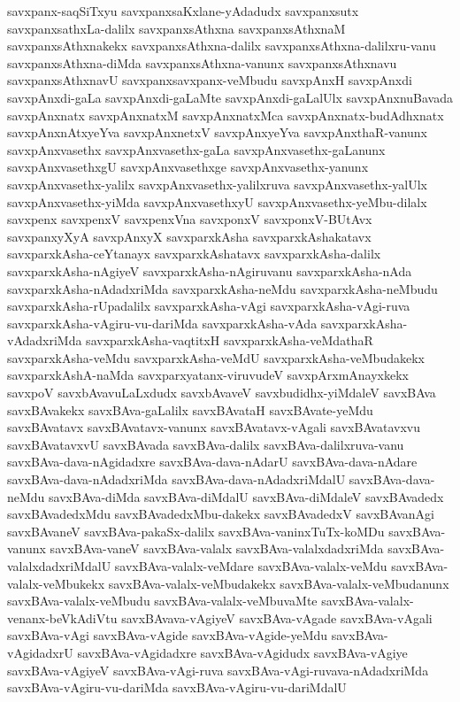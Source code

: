 {savxpanx-saqSiTxyu
savxpanxsaKxlane-yAdadudx
savxpanxsutx
savxpanxsathxLa-dalilx
savxpanxsAthxna
savxpanxsAthxnaM
savxpanxsAthxnakekx
savxpanxsAthxna-dalilx
savxpanxsAthxna-dalilxru-vanu
savxpanxsAthxna-diMda
savxpanxsAthxna-vanunx
savxpanxsAthxnavu
savxpanxsAthxnavU
savxpanxsavxpanx-veMbudu
savxpAnxH
savxpAnxdi
savxpAnxdi-gaLa
savxpAnxdi-gaLaMte
savxpAnxdi-gaLalUlx
savxpAnxnuBavada
savxpAnxnatx
savxpAnxnatxM
savxpAnxnatxMca
savxpAnxnatx-budAdhxnatx
savxpAnxnAtxyeYva
savxpAnxnetxV
savxpAnxyeYva
savxpAnxthaR-vanunx
savxpAnxvasethx
savxpAnxvasethx-gaLa
savxpAnxvasethx-gaLanunx
savxpAnxvasethxgU
savxpAnxvasethxge
savxpAnxvasethx-yanunx
savxpAnxvasethx-yalilx
savxpAnxvasethx-yalilxruva
savxpAnxvasethx-yalUlx
savxpAnxvasethx-yiMda
savxpAnxvasethxyU
savxpAnxvasethx-yeMbu-dilalx
savxpenx
savxpenxV
savxpenxVna
savxponxV
savxponxV-BUtAvx
savxpanxyXyA
savxpAnxyX
savxparxkAsha
savxparxkAshakatavx
savxparxkAsha-ceYtanayx
savxparxkAshatavx
savxparxkAsha-dalilx
savxparxkAsha-nAgiyeV
savxparxkAsha-nAgiruvanu
savxparxkAsha-nAda
savxparxkAsha-nAdadxriMda
savxparxkAsha-neMdu
savxparxkAsha-neMbudu
savxparxkAsha-rUpadalilx
savxparxkAsha-vAgi
savxparxkAsha-vAgi-ruva
savxparxkAsha-vAgiru-vu-dariMda
savxparxkAsha-vAda
savxparxkAsha-vAdadxriMda
savxparxkAsha-vaqtitxH
savxparxkAsha-veMdathaR
savxparxkAsha-veMdu
savxparxkAsha-veMdU
savxparxkAsha-veMbudakekx
savxparxkAshA-naMda
savxparxyatanx-viruvudeV
savxpArxmAnayxkekx
savxpoV
savxbAvavuLaLxdudx
savxbAvaveV
savxbudidhx-yiMdaleV
savxBAva
savxBAvakekx
savxBAva-gaLalilx
savxBAvataH
savxBAvate-yeMdu
savxBAvatavx
savxBAvatavx-vanunx
savxBAvatavx-vAgali
savxBAvatavxvu
savxBAvatavxvU
savxBAvada
savxBAva-dalilx
savxBAva-dalilxruva-vanu
savxBAva-dava-nAgidadxre
savxBAva-dava-nAdarU
savxBAva-dava-nAdare
savxBAva-dava-nAdadxriMda
savxBAva-dava-nAdadxriMdalU
savxBAva-dava-neMdu
savxBAva-diMda
savxBAva-diMdalU
savxBAva-diMdaleV
savxBAvadedx
savxBAvadedxMdu
savxBAvadedxMbu-dakekx
savxBAvadedxV
savxBAvanAgi
savxBAvaneV
savxBAva-pakaSx-dalilx
savxBAva-vaninxTuTx-koMDu
savxBAva-vanunx
savxBAva-vaneV
savxBAva-valalx
savxBAva-valalxdadxriMda
savxBAva-valalxdadxriMdalU
savxBAva-valalx-veMdare
savxBAva-valalx-veMdu
savxBAva-valalx-veMbukekx
savxBAva-valalx-veMbudakekx
savxBAva-valalx-veMbudanunx
savxBAva-valalx-veMbudu
savxBAva-valalx-veMbuvaMte
savxBAva-valalx-venanx-beVkAdiVtu
savxBAvava-vAgiyeV
savxBAva-vAgade
savxBAva-vAgali
savxBAva-vAgi
savxBAva-vAgide
savxBAva-vAgide-yeMdu
savxBAva-vAgidadxrU
savxBAva-vAgidadxre
savxBAva-vAgidudx
savxBAva-vAgiye
savxBAva-vAgiyeV
savxBAva-vAgi-ruva
savxBAva-vAgi-ruvava-nAdadxriMda
savxBAva-vAgiru-vu-dariMda
savxBAva-vAgiru-vu-dariMdalU
}
